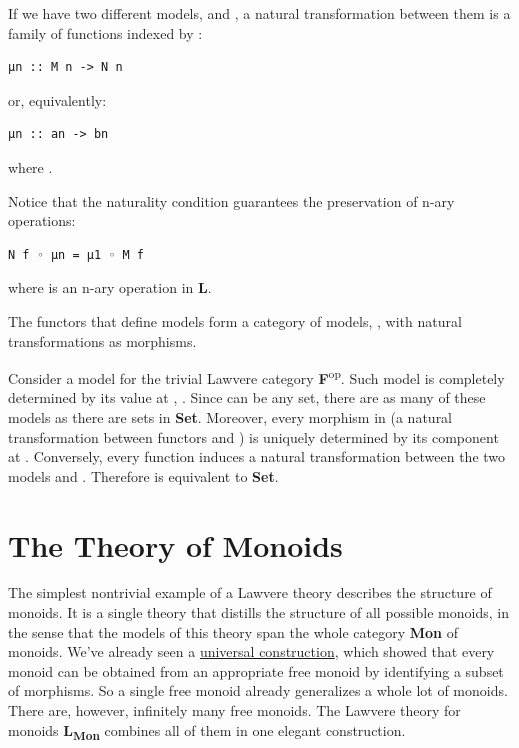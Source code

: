If we have two different models,  and , a natural
transformation between them is a family of functions indexed by
:

\begin{verbatim}
μn :: M n -> N n
\end{verbatim}

or, equivalently:

\begin{verbatim}
μn :: an -> bn
\end{verbatim}

where .

Notice that the naturality condition guarantees the preservation of
n-ary operations:

\begin{verbatim}
N f ◦ μn = μ1 ◦ M f
\end{verbatim}

where  is an n-ary operation in
\textbf{L}.

The functors that define models form a category of models,
, with natural transformations as morphisms.

Consider a model for the trivial Lawvere category
\textbf{F}\textsuperscript{op}. Such model is completely determined by
its value at , . Since  can be any
set, there are as many of these models as there are sets in
\textbf{Set}. Moreover, every morphism in  (a
natural transformation between functors  and ) is
uniquely determined by its component at . Conversely, every
function  induces a natural
transformation between the two models  and .
Therefore  is equivalent to \textbf{Set}.

\section{The Theory of Monoids}\label{the-theory-of-monoids}

The simplest nontrivial example of a Lawvere theory describes the
structure of monoids. It is a single theory that distills the structure
of all possible monoids, in the sense that the models of this theory
span the whole category \textbf{Mon} of monoids. We've already seen a
\href{https://bartoszmilewski.com/2015/07/21/free-monoids/}{universal
construction}, which showed that every monoid can be obtained from an
appropriate free monoid by identifying a subset of morphisms. So a
single free monoid already generalizes a whole lot of monoids. There
are, however, infinitely many free monoids. The Lawvere theory for
monoids \textbf{L\textsubscript{Mon}} combines all of them in one
elegant construction.

